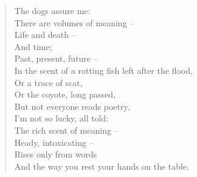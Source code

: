 \documentclass[12pt,letterpaper,oneside]{memoir}
\begin{document}
  \pagestyle{empty}
  \begin{verse}
    The dogs assure me:\\
    There are volumes of meaning --\\
    Life and death --\\
    And time;\\
    Past, present, future --\\
    In the scent of a rotting fish left after the flood,\\
    Or a trace of scat,\\
    Or the coyote, long passed,\\
    But not everyone reads poetry.\\

    \vspace{1pc}
    I'm not so lucky, all told:\\
    The rich scent of meaning --\\
    Heady, intoxicating --\\
    Rises only from words\\
    And the way you rest your hands on the table.
  \end{verse}
\end{document}
